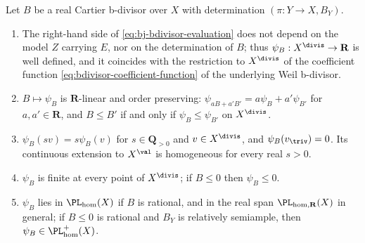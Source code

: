 \begin{proposition}
\label{prop:ch38-evaluation-welldefined}
Let $B$ be a real Cartier b-divisor over $X$ with determination
$(\pi:Y\to X,B_Y)$.
\begin{enumerate}
\item\label{itm:ch38-ev:welldef}
 The right-hand side of \eqref{eq:bj-bdivisor-evaluation} does not depend
 on the model $Z$ carrying $E$, nor on the determination of $B$;
 thus $\psi_B:X^{\divis}\to\mathbf R$ is well defined, and it coincides
 with the restriction to $X^{\divis}$ of the coefficient function
 \eqref{eq:bdivisor-coefficient-function} of the underlying Weil
 b-divisor.
\item\label{itm:ch38-ev:linear}
 $B\mapsto\psi_B$ is $\mathbf R$-linear and order preserving:
 $\psi_{aB+a'B'}=a\psi_B+a'\psi_{B'}$ for $a,a'\in\mathbf R$, and
 $B\leq B'$ if and only if $\psi_B\leq\psi_{B'}$ on $X^{\divis}$.
\item\label{itm:ch38-ev:homog}
 $\psi_B(sv)=s\psi_B(v)$ for $s\in\mathbf Q_{>0}$ and
 $v\in X^{\divis}$, and $\psi_B(v_{\triv})=0$. Its continuous
 extension to $X^{\val}$ is homogeneous for every real $s>0$.
\item\label{itm:ch38-ev:finite}
 $\psi_B$ is finite at every point of $X^{\divis}$; if $B\leq0$
 then $\psi_B\leq0$.
\item\label{itm:ch38-ev:pl}
 $\psi_B$ lies in $\PL_{\mathrm{hom}}(X)$ if $B$ is rational, and in
 the real span $\PL_{\mathrm{hom},\mathbf R}(X)$ in general; if
 $B\leq0$ is rational and $B_Y$ is relatively semiample, then
 $\psi_B\in\PL^+_{\mathrm{hom}}(X)$.
\end{enumerate}
\end{proposition}

